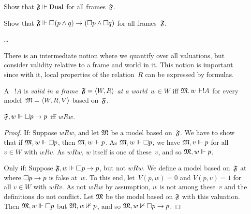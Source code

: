 \documentclass[modal-logic]{subfiles}
\begin{document}
\begin{prob}
Show that $\mathfrak F \Vdash \mathrm{Dual}$ for all frames~$\mathfrak F$.
\end{prob}

\begin{prob}
Show that $\mathfrak F \Vdash \Box(p \land q) \to (\Box p \land \Box q)$ for all frames~$\mathfrak F$.
\end{prob}

\begin{ex}
\dots
\end{ex}

There is an intermediate notion where we quantify over all valuations, but consider validity relative to a frame and world in it.  This notion is important since with it, local properties of the relation~$R$ can be expressed by formulas.

\begin{defn}
A \formula~$!A$ is \emph{valid in a frame~$\mathfrak F = \langle W, R\rangle$ at a world~$w \in W$} iff $\mathfrak M, w \Vdash !A$ for every model~$\mathfrak M = \langle W, R, V\rangle$ based on~$\mathfrak F$.
\end{defn}

\begin{prop}
$\mathfrak F, w \Vdash \Box p \to p$ iff $wRw$.
\end{prop}

\begin{proof}
If: Suppose $wRw$, and let $\mathfrak M$ be a model based on~$\mathfrak F$.  We have to show that if $\mathfrak M, w \Vdash \Box p$, then $\mathfrak M, w \Vdash p$.  As $\mathfrak M, w \Vdash \Box p$, we have $\mathfrak M, v \Vdash p$ for all $v \in W$ with $wRv$. As $wRw$, $w$ itself is one of these~$v$, and so $\mathfrak M, w \Vdash p$.

Only if: Suppose $\mathfrak F, w \Vdash \Box p \to p$, but not $wRw$.  We define a model based on~$\mathfrak F$ at where $\Box p \to p$ is false at~$w$.  To this end, let~$V(p, w) = 0$ and $V(p, v) = 1$ for all $v \in W$ with $wRv$.  As not $wRw$ by assumption, $w$ is not among these~$v$ and the definitions do not conflict. Let $\mathfrak M$ be the model based on $\mathfrak F$ with this valuation.  Then $\mathfrak M, w \Vdash \Box p$ but $\mathfrak M, w \nVdash p$, and so $\mathfrak M, w \nVdash \Box p \to p$.
\end{proof}
\end{document}
